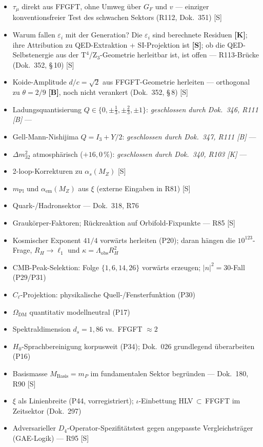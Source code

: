\begin{itemize}\itemsep2pt
  \item $\tau_\mu$ direkt aus FFGFT, ohne Umweg über $G_F$ und $v$ --- einziger konventionsfreier Test des schwachen Sektors (R112, Dok.~351) [S]
  \item Warum fallen $\varepsilon_i$ mit der Generation? Die $\varepsilon_i$ sind berechnete Residuen \textbf{[K]}; ihre Attribution zu QED-Extraktion + SI-Projektion ist \textbf{[S]}; ob die QED-Selbstenergie aus der T$^4$/Z$_3$-Geometrie herleitbar ist, ist offen --- R113-Brücke (Dok.~352, §\,10) [S]
  \item Koide-Amplitude $d/c=\sqrt{2}$ aus FFGFT-Geometrie herleiten --- orthogonal zu $\theta=2/9$ \textbf{[B]}, noch nicht verankert (Dok.~352, §\,8) [S]
  \item Ladungsquantisierung $Q\in\{0,\pm\tfrac{1}{3},\pm\tfrac{2}{3},\pm1\}$: \emph{geschlossen durch Dok.~346, R111 [B]} ---
  \item Gell-Mann-Nishijima $Q=I_3+Y/2$: \emph{geschlossen durch Dok.~347, R111 [B]} ---
  \item $\Delta m_{32}^2$ atmosphärisch ($+16{,}0\,\%$): \emph{geschlossen durch Dok.~340, R103 [K]} ---
  \item 2-loop-Korrekturen zu $\alpha_s(M_Z)$ [S]
  \item $m_{\mathrm{Pl}}$ und $\alpha_{\mathrm{em}}(M_Z)$ aus $\xi$ (externe Eingaben in R81) [S]
  \item Quark-/Hadronsektor --- Dok.~318, R76
  \item Grauk\"orper-Faktoren; R\"uckreaktion auf Orbifold-Fixpunkte --- R85 [S]
  \item Kosmischer Exponent $41/4$ vorw\"arts herleiten (P20); daran h\"angen die $10^{123}$-Frage, $R_H\to\ell_1$ und $\kappa = \Lambda_{\mathrm{obs}}R_H^2$
  \item CMB-Peak-Selektion: Folge $\{1,6,14,26\}$ vorw\"arts erzeugen; $|n|^2{=}30$-Fall (P29/P31)
  \item $C_\ell$-Projektion: physikalische Quell-/Fensterfunktion (P30)
  \item $\Omega_{\mathrm{DM}}$ quantitativ modellneutral (P17)
  \item Spektraldimension $d_s = 1{,}86$ vs.\ FFGFT $\approx 2$
  \item $H_0$-Sprachbereinigung korpusweit (P34); Dok.~026 grundlegend \"uberarbeiten (P16)
  \item Basismasse $M_\mathrm{Basis} = m_P$ im fundamentalen Sektor begründen --- Dok.~180, R90 [S]
  \item $\xi$ als Linienbreite (P44, vorregistriert); $\iota$-Einbettung HLV$\,\subset\,$FFGFT im Zeitsektor (Dok.~297)
  \item Adversarieller $D_4$-Operator-Spezifitätstest gegen angepasste Vergleichsträger (GAE-Logik) --- R95 [S]
\end{itemize}
